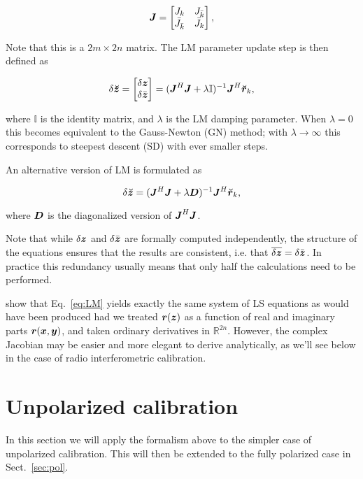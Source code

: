 \documentclass[useAMS,usenatbib]{mn2e}
\newcommand{\REAL}{\mathbb{R}}
\newcommand{\II}{\mathbb{I}}
\newcommand{\zz}{\bmath{z}}
\newcommand{\rr}{\bmath{r}}
\newcommand{\mat}[1]{{\bmath{#1}}}
\newcommand{\JJ}{\mat{J}} %
\newcommand{\DD}{\mat{D}}
\begin{document}
\begin{equation}
\label{eq:JJ}
\JJ = \Matrix{cc}{J_k & J_{\bar{k}} \\ \bar{J}_{\bar{k}} & \bar{J}_k },
\end{equation}

Note that this is a $2m \times 2n$ matrix. The LM parameter update step is then defined as

\begin{equation}
\label{eq:LM}
\delta\Zz = \Matrix{c}{\delta \zz \\ \delta \bar{\zz}} = (\JJ^H \JJ + \lambda\II)^{-1}\JJ^H \Rr_k,
\end{equation}

where $\II$ is the identity matrix, and $\lambda$ is the LM damping parameter. When $\lambda=0$ this becomes 
equivalent to the Gauss-Newton (GN) method; with $\lambda\to\infty$ this corresponds to steepest descent (SD) with ever smaller steps.

An alternative version of LM is formulated as

\begin{equation}
\label{eq:LM1}
\delta\Zz = (\JJ^H \JJ + \lambda \DD)^{-1}\JJ^H \Rr_k,
\end{equation}

where $\DD$ is the diagonalized version of $\JJ^H\JJ$.

Note that while $\delta\zz$ and $\delta \bar{\zz}$ are formally computed independently, the structure of the equations 
ensures that the results are consistent, i.e. that $\overline{\delta\zz} = \delta \bar{\zz}$. In practice this 
redundancy usually means that only half the calculations need to be performed.

\citet{ComplexOpt} show that Eq.~\ref{eq:LM} yields exactly the same system of LS equations as would have 
been produced had we treated $\rr(\zz)$ as a function of real and imaginary parts $\rr(\bmath{x},\bmath{y})$, 
and taken ordinary derivatives in $\REAL^{2n}$. However, the complex Jacobian may be easier and more elegant 
to derive analytically, as we'll see below in the case of radio interferometric calibration.

\section{Unpolarized calibration}
\label{sec:unpol}

In this section we will apply the formalism above to the simpler case of unpolarized calibration. 
This will then be extended to the fully polarized case in Sect.~\ref{sec:pol}.
\end{document}
